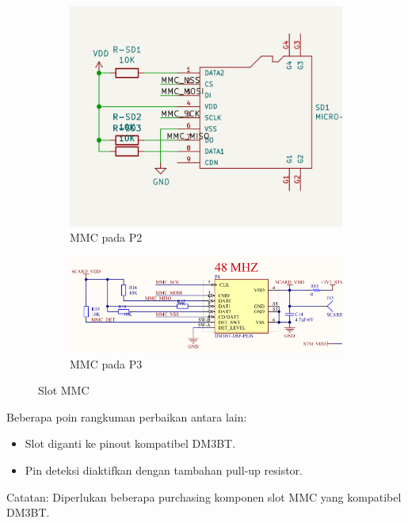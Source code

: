 \documentclass{book} %
\begin{document}
    \begin{figure}[!ht]
    	\centering
    	\begin{subfigure}[t]{0.25\textwidth}
    		\includegraphics[width=\textwidth]{images/p2_mmc}
    		\caption{MMC pada P2}
    	\end{subfigure}
    	\begin{subfigure}[t]{0.60\textwidth}
    		\includegraphics[width=\textwidth]{images/p3_mmc}
    		\caption{MMC pada P3}
    	\end{subfigure}
    	\caption{Slot MMC}
    \end{figure}

	Beberapa poin rangkuman perbaikan antara lain:
	\begin{itemize}
		\item Slot diganti ke pinout kompatibel DM3BT.
		\item Pin deteksi diaktifkan dengan tambahan pull-up resistor.
	\end{itemize}

	Catatan: Diperlukan beberapa purchasing komponen slot MMC yang kompatibel DM3BT.
    
\end{document}
